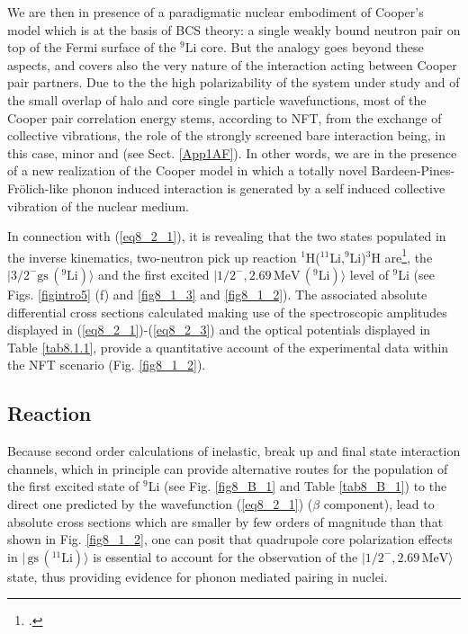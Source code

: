 We are then in presence of a paradigmatic nuclear embodiment of Cooper's model which is at the basis of BCS theory: a single weakly bound neutron pair on top of the Fermi surface of the ${}^9$Li core. But the analogy goes beyond these aspects, and covers also the very nature of the interaction acting between Cooper pair partners. Due to the  the high polarizability of the system under study and of the small overlap of halo and core single particle wavefunctions, most of the Cooper pair correlation energy stems, according to NFT, from the exchange of collective vibrations, the role of the strongly screened bare interaction being, in this case, minor and  (see Sect. \ref{App1AF}). In other words, we are in the presence of a new realization of the Cooper model in which a totally novel Bardeen-Pines-Fr\"olich-like phonon induced interaction is generated by a self induced collective vibration of the nuclear medium.



 In connection with  (\ref{eq8_2_1}), it is revealing that the two states populated in the  inverse kinematics, two-neutron pick up reaction $^1$H($^{11}$Li,$^9$Li)$^3$H are\footnote{\cite{Tanihata:08}.}, the $|3/2^-\text{gs}\,(^9\text{Li})\rangle$ and the first excited $|1/2^-,2.69\,\text{MeV}\,(^9\text{Li})\rangle$ level of $^9$Li  (see Figs. \ref{figintro5} (f) and \ref{fig8_1_3} and \ref{fig8_1_2}). The associated absolute differential cross sections calculated making use of the spectroscopic amplitudes displayed in (\ref{eq8_2_1})-(\ref{eq8_2_3}) and the optical potentials displayed in Table \ref{tab8.1.1}, provide a quantitative account of the experimental data  within the NFT scenario (Fig. \ref{fig8_1_2}).  
 
 
 
\subsection{Reaction}\label{C6S1.2}
Because second order calculations of inelastic, break up and final state interaction channels, which in principle can provide alternative routes for the population of the first excited state of $^9$Li (see Fig. \ref{fig8_B_1} and Table \ref{tab8_B_1}) to the direct one predicted by the wavefunction (\ref{eq8_2_1})  ($\beta$ component), lead to absolute cross sections which are smaller by few orders of magnitude than that shown in Fig. \ref{fig8_1_2}, one can posit that quadrupole core polarization effects in $|\,\text{gs}\,(^{11}\text{Li})\rangle$ is essential to account for the observation of the $|1/2^-,2.69\,\text{MeV}\rangle$ state, thus providing
  evidence for phonon mediated pairing in nuclei. 
 

